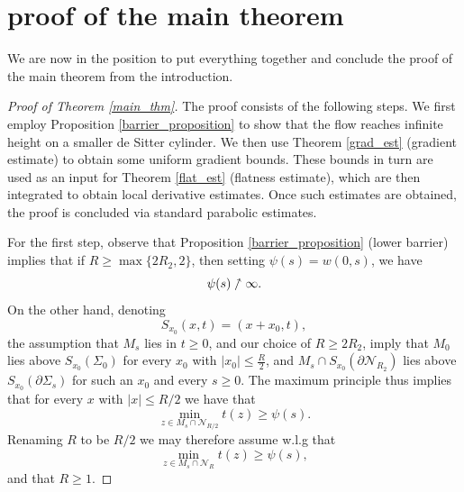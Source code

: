\documentclass[leqno,11pt]{amsart}
\theoremstyle{definition}
\begin{document}
\section{proof of the main theorem}
We are now in the position to put everything together and conclude the proof of the main theorem from the introduction.
\begin{proof}[Proof of Theorem \ref{main_thm}]
{The proof consists of the following steps. We first employ Proposition \ref{barrier_proposition} to show that the flow reaches infinite height on a smaller de Sitter cylinder. We then use Theorem \ref{grad_est} (gradient estimate) to obtain some uniform gradient bounds. These bounds in turn are used as an input for Theorem \ref{flat_est} (flatness estimate), which are then integrated to obtain local derivative estimates. Once such estimates are obtained, the proof is concluded via standard parabolic estimates.}     

\bigskip

{For the first step}, observe that Proposition \ref{barrier_proposition} (lower barrier) implies that if { $R\geq \max\{2R_2,2\}$}, then setting $\psi(s)=w(0,s)$, we have 
\begin{equation}\label{psi_goes}
\psi(s)\nnearrow \infty.
\end{equation}
On the other hand, denoting
\begin{equation}
S_{x_0}(x,t)=(x+x_0,t),
\end{equation}
the assumption that $M_s$ lies in $t\geq 0$, { and our choice of $R\geq 2R_2$, imply} that $M_0$ lies above $S_{x_0}(\Sigma_0)$  for every $x_0$ with $|x_0| \leq {\frac{R}{2}}$, and { $M_s\cap S_{x_0}(\partial \mathcal{N}_{R_2})$ lies above $S_{x_0}\left(\partial \Sigma_s\right)$ for such an $x_0$ and every $s\geq 0$}. The maximum principle thus implies that for every $x$ with $|x|\leq R/2$ we have that 
\begin{equation}
\min_{z\in M_s\cap \mathcal{N}_{R/2}} t(z)\geq \psi(s).
\end{equation}
Renaming $R$ to be $R/2$ we may therefore assume w.l.g that
\begin{equation}\label{bd_up}
\min_{z\in M_s\cap \mathcal{N}_{R}} t(z)\geq \psi(s),
\end{equation}
{ and that $R\geq 1$.} 


\end{proof}
\end{document}
